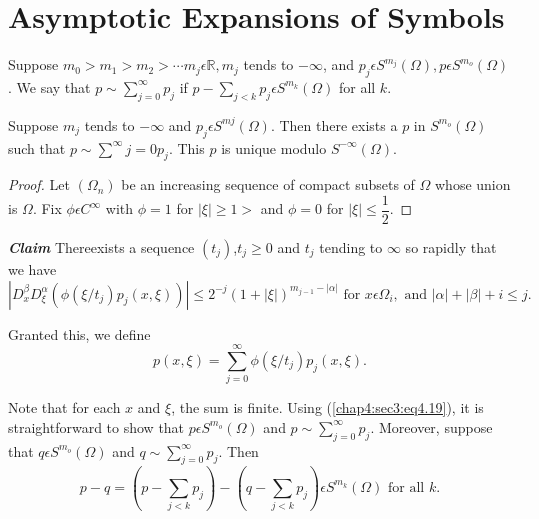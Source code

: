\section{Asymptotic Expansions of Symbols}\label{chap4:sec3} 

\setcounter{defi}{16}
\begin{defi} \label{chap4:sec3:def4.17} 
  Suppose $m_0 > m_1 > m_2 > \cdots m_j \epsilon \mathbb{R}, m_j$
  tends to $-\infty$, and $p_j \epsilon S^{m_j}(\Omega), p
  \epsilon S^{m_o}(\Omega)$. We say that $p \sim \sum
  \limits^{\infty}_{j=0}p_j$ if $p- \sum \limits_{j < k}p_j \epsilon
  S^{m_k}(\Omega)$ for all $k$.  
\end{defi}

\setcounter{prop}{17}
\begin{prop} \label{chap4:sec3:prop4.18} 
  Suppose $m_j$ tends to $-\infty$ and $p_j \epsilon
  S^{mj}(\Omega)$. Then there exists a $p$ in $S^{m_o}(\Omega)$ such
  that $p \sim \sum\limits^{\infty}{j=0}p_j$. This $p$ is unique
  modulo $S^{-\infty}(\Omega)$. 
\end{prop}

\begin{proof}
  Let $(\Omega_n)$ be an increasing sequence of compact subsets of
  $\Omega$ whose union is $\Omega$.  Fix $\phi \epsilon C^\infty$
  with $\phi =1$ for $|\xi | \ge 1>$ and $\phi = 0$ for $|\xi|\le
  \dfrac{1}{2}$.  
\end{proof}

 \textit{\textbf{Claim}}\quad
There\pageoriginale exists a sequence $(t_j)$,$t_j \ge 0$ and $t_j$ tending to
$\infty$ so rapidly that we have 
\begin{equation*}
  |D^\beta_x D^\alpha_\xi (\phi(\xi/ t_j)p_j(x,\xi))| \le
  2^{-j}(1+|\xi|)^{m_{j-1}-|\alpha|} \text{ for } x \epsilon
  \Omega_i, \text{ and } |\alpha|+| \beta | + i \le
  j. \tag{4.19} \label{chap4:sec3:eq4.19}  
\end{equation*}

Granted this, we define
$$
p(x,\xi)= \sum^{\infty}_{j=0} \phi(\xi/t_j)p_j(x,\xi). 
$$

Note that for each $x$ and $\xi$, the sum is finite. Using
(\ref{chap4:sec3:eq4.19}), 
it is straightforward to show that $p \epsilon S^{m_o}(\Omega)$ and
$p \sim \sum \limits^{\infty}_{j=0}p_j$. Moreover, suppose that $q
\epsilon S^{m_o}(\Omega)$ and $q \sim
\sum\limits^{\infty}_{j=0}p_j$. Then 
$$
p-q=(p-\sum \limits_{j<k}p_j)-(q-\sum \limits_{j < k}p_j)\epsilon
S^{m_k}(\Omega) \text { for all } k.  
$$

